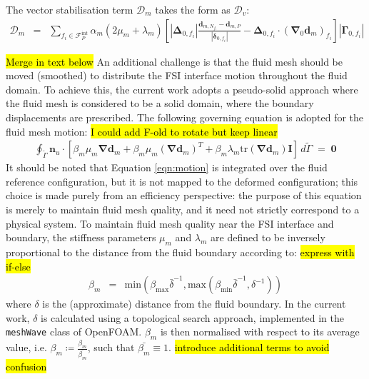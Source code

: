 \documentclass[sn-mathphys,Numbered]{sn-jnl}%
\newcommand{\bb}{\boldsymbol}
\begin{document}
The vector stabilisation term $\bb{\mathcal{D}}_m$ takes the form as $\bb{\mathcal{D}}_v$:
\begin{eqnarray}
	\bb{\mathcal{D}}_m
	&=& \sum_{f_i \in \mathcal{F}^{\text{int}}_P} \alpha_m (2\mu_m + \lambda_m) \left[
		\left|\bb{\Delta}_{0,f_i} \right| \frac{ \bb{d}_{m,N_{f_i}} - \bb{d}_{m,P}}{\left|\bb{\delta}_{0,f_i}\right|}	- \bb{\Delta}_{0,f_i} \cdot \left(\bb{\nabla}_0 \bb{d}_m \right)_{f_i}
		\right]    \left|\bb{\Gamma}_{0,f_i}\right|
\end{eqnarray}


\hl{Merge in text below}
An additional challenge is that the fluid mesh should be moved (smoothed) to distribute the FSI interface motion throughout the fluid domain.
To achieve this, the current work adopts a pseudo-solid approach where the fluid mesh is considered to be a solid domain, where the boundary displacements are prescribed.
The following governing equation is adopted for the fluid mesh motion: \hl{I could add F-old to rotate but keep linear}
\begin{eqnarray} \label{eqn:motion}
    \oint_{\tilde{\Gamma}}
    \bb{n}_u \cdot \left[ \beta_m \mu_m \bb{\nabla}\bb{d}_m
    + \beta_m \mu_m (\bb{\nabla}\bb{d}_m)^T
    + \beta_m \lambda_m \text{tr}(\bb{\nabla} \bb{d}_m)\textbf{I} \right] 
    \, d\tilde{\Gamma}
    \;=\; \bb{0}
\end{eqnarray}
It should be noted that Equation \ref{eqn:motion} is integrated over the fluid reference configuration, but it is not mapped to the deformed configuration; this choice is made purely from an efficiency perspective: the purpose of this equation is merely to maintain fluid mesh quality, and it need not strictly correspond to a physical system.
To maintain fluid mesh quality near the FSI interface and boundary, the stiffness parameters $\mu_m$ and $\lambda_m$ are defined to be inversely proportional to the distance from the fluid boundary according to:
\hl{express with if-else}
\begin{eqnarray}
	\beta_m &=& \text{min}(\beta_\text{max} \bar{\delta}^{-1}, \text{max}(\beta_\text{min} \bar{\delta}^{-1}, \delta^{-1}))
\end{eqnarray}
where $\delta$ is the (approximate) distance from the fluid boundary.
In the current work, $\delta$ is calculated using a topological search approach, implemented in the \texttt{meshWave} class of OpenFOAM.
$\beta_m$ is then normalised with respect to its average value, i.e. $\beta_m \coloneqq \frac{\beta_m}{\bar{\beta_m}}$, such that $\bar{\beta_m} \equiv 1$. \hl{introduce additional terms to avoid confusion}
\end{document}
